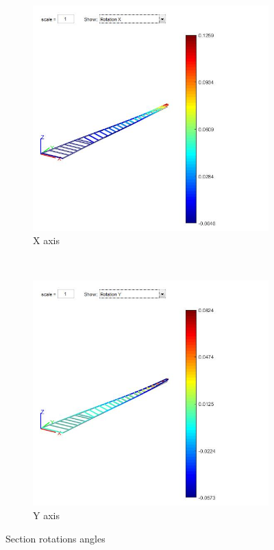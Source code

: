 \begin{figure}[h]
	\centering
	\begin{subfigure}{0.45\textwidth}
		\includegraphics[width=\textwidth]{img/RotationX.jpg}
		\caption{X axis}
		\label{fig:rot_x}
	\end{subfigure}
	~ %
	\begin{subfigure}{0.45\textwidth}
		\includegraphics[width=\textwidth]{img/RotationY.jpg}
		\caption{Y axis}
		\label{fig:rot_y}
	\end{subfigure}
	\caption{Section rotations angles}
	\label{fig:rotations}
\end{figure}

